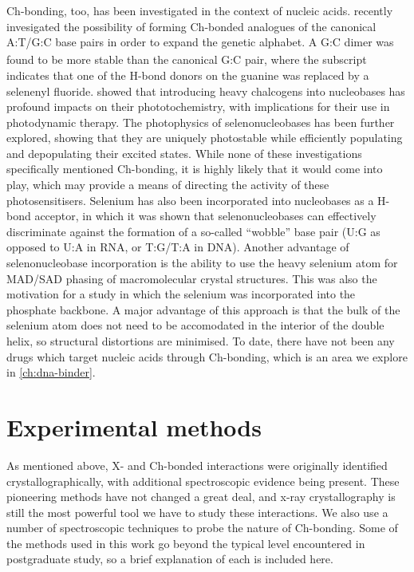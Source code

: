 \begin{refsection}
Ch-bonding, too, has been investigated in the context of nucleic acids.
 recently invesigated the possibility of forming Ch-bonded analogues of the canonical A:T/G:C base pairs in order to expand the genetic alphabet.\autocite{Sharma2020}
A G\textsubscript{}:C dimer was found to be more stable than the canonical G:C pair, where the  subscript indicates that one of the H-bond donors on the guanine was replaced by a selenenyl fluoride.
 showed that introducing heavy chalcogens into nucleobases has profound impacts on their phototochemistry, with implications for their use in photodynamic therapy.\autocite{Farrell2018}
The photophysics of selenonucleobases has been further explored, showing that they are uniquely photostable while efficiently populating and depopulating their excited states.\autocite{Mai2019,Peng2020,Fang2019,Uleany2020}
While none of these investigations specifically mentioned Ch-bonding, it is highly likely that it would come into play, which may provide a means of directing the activity of these photosensitisers.
Selenium has also been incorporated into nucleobases as a H-bond acceptor, in which it was shown that selenonucleobases can effectively discriminate against the formation of a so-called ``wobble'' base pair (U:G as opposed to U:A in RNA, or T:G/T:A in DNA).\autocite{Hassan2010,Sun2012}
Another advantage of selenonucleobase incorporation is the ability to use the heavy selenium atom for MAD/SAD phasing of macromolecular crystal structures.\autocite{Salon2007}
This was also the motivation for a \citeyear{Conlon2019} study in which the selenium was incorporated into the phosphate backbone.\autocite{Conlon2019}
A major advantage of this approach is that the bulk of the selenium atom does not need to be accomodated in the interior of the double helix, so structural distortions are minimised.
To date, there have not been any drugs which target nucleic acids through Ch-bonding, which is an area we explore in \cref{ch:dna-binder}.

\section{Experimental methods}
As mentioned above, X- and Ch-bonded interactions were originally identified crystallographically, with additional spectroscopic evidence being present.
These pioneering methods have not changed a great deal, and x-ray crystallography is still the most powerful tool we have to study these interactions.
We also use a number of spectroscopic techniques to probe the nature of Ch-bonding.
Some of the methods used in this work go beyond the typical level encountered in postgraduate study, so a brief explanation of each is included here.


\end{refsection}
